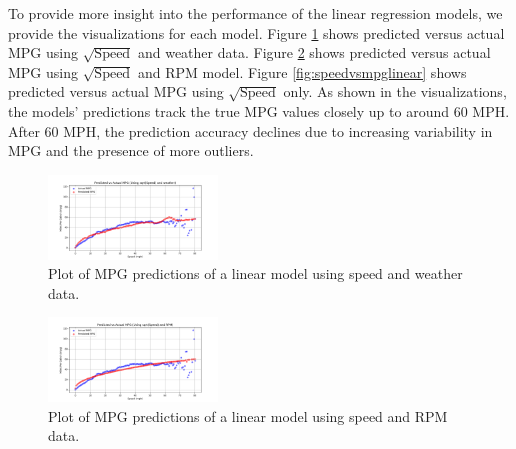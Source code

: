 \documentclass[letterpaper]{article}
\begin{document}
\begin{table}
    \centering
    \caption{Comparison of Linear Regression Models}
    \label{tab:linear_models_comparison_table}
\end{table}

To provide more insight into the performance of the linear regression 
models, we provide the visualizations for each model. Figure 
\ref{fig:weatherspeedvsmpg} shows  predicted versus actual MPG using 
$\sqrt{\mathrm{Speed}}$ and weather data. Figure \ref{fig:rpmspeedvsmpg}
shows predicted versus actual MPG using $\sqrt{\mathrm{Speed}}$ and RPM 
model. Figure \ref{fig:speedvsmpglinear} shows predicted versus actual MPG 
using $\sqrt{\mathrm{Speed}}$ only. As shown in the visualizations, the 
models' predictions track the true MPG values closely up to around 60 MPH. 
After 60 MPH, the prediction accuracy declines due to increasing 
variability in MPG and the presence of more outliers.

\begin{figure}[htbp]
    \centering
    \includegraphics[width=0.4\textwidth]{figures/sqrt_speed_weather_vs_mpg_multiregression_model.png}
    \caption{Plot of MPG predictions of a linear model using speed and weather data.}
    \label{fig:weatherspeedvsmpg}
\end{figure}

\begin{figure}[htbp]
    \centering
    \includegraphics[width=0.4\textwidth]{figures/sqrt_speed_rpm_vs_mpg_multiregression_model.png}
    \caption{Plot of MPG predictions of a linear model using speed and RPM data.}
    \label{fig:rpmspeedvsmpg}
\end{figure}
\end{document}
